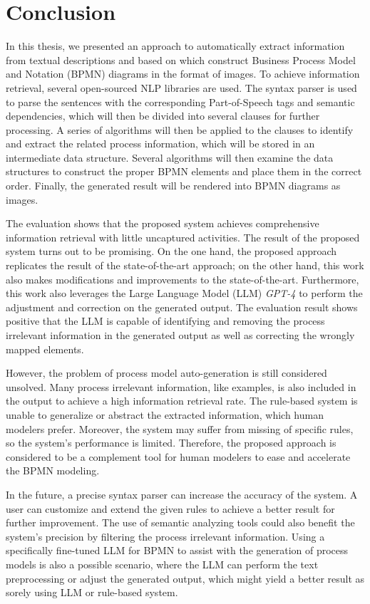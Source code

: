 \chapter{Conclusion}
\label{sec:conclusion}

In this thesis, we presented an approach to automatically extract information from textual descriptions and based on which construct Business Process Model and Notation (BPMN) diagrams in the format of images. To achieve information retrieval, several open-sourced NLP libraries are used. The syntax parser is used to parse the sentences with the corresponding Part-of-Speech tags and semantic dependencies, which will then be divided into several clauses for further processing. A series of algorithms will then be applied to the clauses to identify and extract the related process information, which will be stored in an intermediate data structure. Several algorithms will then examine the data structures to construct the proper BPMN elements and place them in the correct order. Finally, the generated result will be rendered into BPMN diagrams as images.

The evaluation shows that the proposed system achieves comprehensive information retrieval with little uncaptured activities. The result of the proposed system turns out to be promising. On the one hand, the proposed approach replicates the result of the state-of-the-art approach; on the other hand, this work also makes modifications and improvements to the state-of-the-art. Furthermore, this work also leverages the Large Language Model (LLM) \textit{GPT-4} to perform the adjustment and correction on the generated output. The evaluation result shows positive that the LLM is capable of identifying and removing the process irrelevant information in the generated output as well as correcting the wrongly mapped elements.

However, the problem of process model auto-generation is still considered unsolved. Many process irrelevant information, like examples, is also included in the output to achieve a high information retrieval rate. The rule-based system is unable to generalize or abstract the extracted information, which human modelers prefer. Moreover, the system may suffer from missing of specific rules, so the system's performance is limited. Therefore, the proposed approach is considered to be a complement tool for human modelers to ease and accelerate the BPMN modeling.

In the future, a precise syntax parser can increase the accuracy of the system. A user can customize and extend the given rules to achieve a better result for further improvement. The use of semantic analyzing tools could also benefit the system's precision by filtering the process irrelevant information. Using a specifically fine-tuned LLM for BPMN to assist with the generation of process models is also a possible scenario, where the LLM can perform the text preprocessing or adjust the generated output, which might yield a better result as sorely using LLM or rule-based system.

